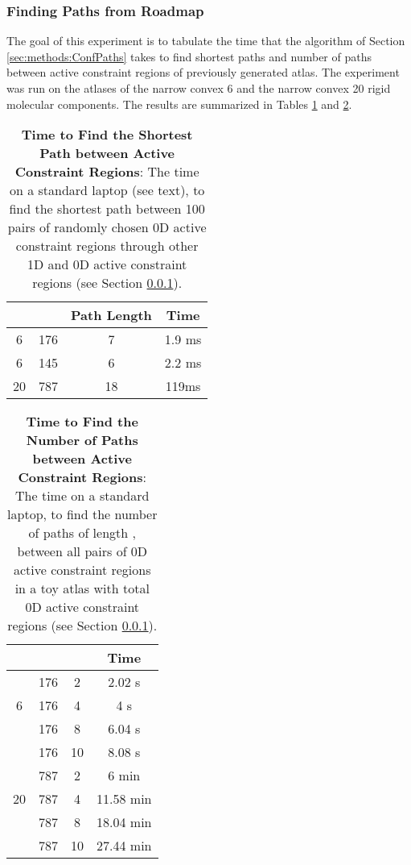 \documentclass[]{article}
\newcommand{\rmc}{rigid molecular component}
\begin{document}
\subsubsection{Finding Paths from Roadmap}
\label{sec:results:ConfPaths}
The goal of this experiment is to tabulate the time that the algorithm of
Section \ref{sec:methods:ConfPaths} takes to find shortest paths and number of
paths between active constraint regions of previously generated atlas.  The
experiment was run on the atlases of the narrow convex 6 and the narrow convex
20 \rmc s. The results are summarized in Tables \ref{table:paths} and 
\ref{table:numPaths}.

\begin{table}
\centering
\begin{tabular}{|cccc|}\hline
 &  & Path Length& Time \\\hline
6& 176 & 7 & 1.9 ms \\\hline
6& 145 & 6 & 2.2 ms \\\hline
20& 787 & 18 & 119ms\\\hline
\end{tabular}
\caption{\scriptsize \textbf{Time to Find the Shortest Path between Active 
Constraint Regions}: 
The time on a standard laptop (see text), to find the 
shortest path between 100 pairs of randomly chosen 0D active constraint regions 
through other 1D and 0D active constraint regions (see Section \ref{sec:results:ConfPaths}).}
\label{table:paths}
\end{table}

\begin{table}
\centering
\begin{tabular}{|cccc|}\hline
 &  &  & Time \\\hline
\multirow{3}{*}{6}
				&176 & 2 & 2.02 s\\
				&176 & 4 & 4 s\\
				&176 & 8 & 6.04 s\\
				&176 & 10 & 8.08 s\\\hline
\multirow{3}{*}{20}
				& 787 & 2 & 6 min\\
				& 787 & 4 & 11.58 min\\
				& 787 & 8 & 18.04 min\\
				& 787 & 10 & 27.44 min\\\hline
\end{tabular}
\caption{\scriptsize \textbf{Time to Find the Number of Paths between Active 
Constraint Regions}: The 
time on a standard laptop, to find the number of paths of 
length , between all pairs of 0D active constraint regions 
in a toy atlas with  total 0D active constraint regions (see Section \ref{sec:results:ConfPaths}).}
\label{table:numPaths}
\end{table}
\end{document}
